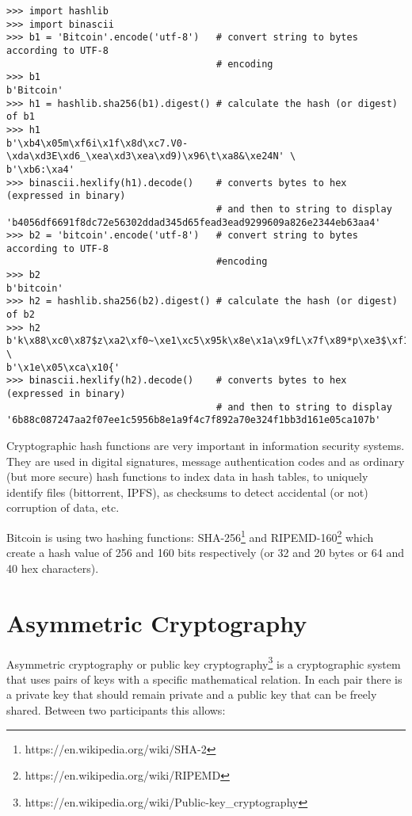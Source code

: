 \vspace{1em}
\begin{lstlisting}[style=Python,label={lst:encodings-4},caption={Python examples},captionpos=b]
>>> import hashlib
>>> import binascii
>>> b1 = 'Bitcoin'.encode('utf-8')   # convert string to bytes according to UTF-8 
                                     # encoding
>>> b1
b'Bitcoin'
>>> h1 = hashlib.sha256(b1).digest() # calculate the hash (or digest) of b1
>>> h1
b'\xb4\x05m\xf6i\x1f\x8d\xc7.V0-\xda\xd3E\xd6_\xea\xd3\xea\xd9)\x96\t\xa8&\xe24N' \
b'\xb6:\xa4'
>>> binascii.hexlify(h1).decode()    # converts bytes to hex (expressed in binary)
                                     # and then to string to display
'b4056df6691f8dc72e56302ddad345d65fead3ead9299609a826e2344eb63aa4'
>>> b2 = 'bitcoin'.encode('utf-8')   # convert string to bytes according to UTF-8
                                     #encoding
>>> b2
b'bitcoin'
>>> h2 = hashlib.sha256(b2).digest() # calculate the hash (or digest) of b2
>>> h2
b'k\x88\xc0\x87$z\xa2\xf0~\xe1\xc5\x95k\x8e\x1a\x9fL\x7f\x89*p\xe3$\xf1\xbb=\x16' \
b'\x1e\x05\xca\x10{'
>>> binascii.hexlify(h2).decode()    # converts bytes to hex (expressed in binary)
                                     # and then to string to display
'6b88c087247aa2f07ee1c5956b8e1a9f4c7f892a70e324f1bb3d161e05ca107b'
\end{lstlisting}
\vspace{1em}

Cryptographic hash functions are very important in information security systems. They are used in digital signatures, message authentication codes and as ordinary (but more secure) hash functions to index data in hash tables, to uniquely identify files (bittorrent, IPFS), as checksums to detect accidental (or not) corruption of data, etc.

\begin{note}
	Bitcoin is using two hashing functions: SHA-256\footnote{https://en.wikipedia.org/wiki/SHA-2} and RIPEMD-160\footnote{https://en.wikipedia.org/wiki/RIPEMD} which create a hash value of 256 and 160 bits respectively (or 32 and 20 bytes or 64 and 40 hex characters).
\end{note}

\section{Asymmetric Cryptography}
Asymmetric cryptography or public key cryptography\footnote{https://en.wikipedia.org/wiki/Public-key\_cryptography} is a cryptographic system that uses pairs of keys with a specific mathematical relation. In each pair there is a private key that should remain private and a public key that can be freely shared. Between two participants this allows:

